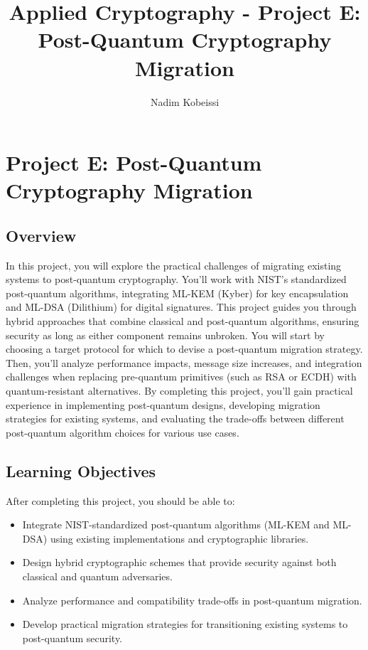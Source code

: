 \documentclass[10pt,a4paper,american]{exam}
\title{Applied Cryptography - Project E: Post-Quantum Cryptography Migration}
\author{Nadim Kobeissi}
\begin{document}
\classhandoutheader
\section*{Project E: Post-Quantum Cryptography Migration}

\subsection*{Overview}
In this project, you will explore the practical challenges of migrating existing systems to post-quantum cryptography. You'll work with NIST's standardized post-quantum algorithms, integrating ML-KEM (Kyber) for key encapsulation and ML-DSA (Dilithium) for digital signatures. This project guides you through hybrid approaches that combine classical and post-quantum algorithms, ensuring security as long as either component remains unbroken. You will start by choosing a target protocol for which to devise a post-quantum migration strategy. Then, you'll analyze performance impacts, message size increases, and integration challenges when replacing pre-quantum primitives (such as RSA or ECDH) with quantum-resistant alternatives. By completing this project, you'll gain practical experience in implementing post-quantum designs, developing migration strategies for existing systems, and evaluating the trade-offs between different post-quantum algorithm choices for various use cases.

\subsection*{Learning Objectives}
After completing this project, you should be able to:
\begin{itemize}
	\item Integrate NIST-standardized post-quantum algorithms (ML-KEM and ML-DSA) using existing implementations and cryptographic libraries.
	\item Design hybrid cryptographic schemes that provide security against both classical and quantum adversaries.
	\item Analyze performance and compatibility trade-offs in post-quantum migration.
	\item Develop practical migration strategies for transitioning existing systems to post-quantum security.
\end{itemize}
\end{document}
